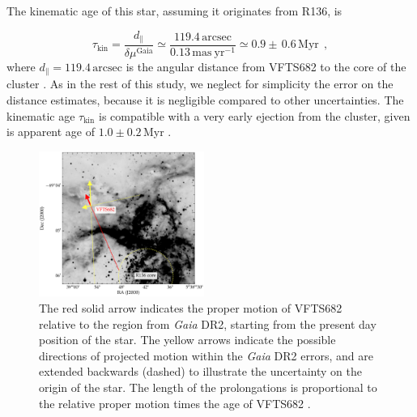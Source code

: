 \documentclass[apjl,twocolumn]{emulateapj}
\newcommand{\todo}[1]{{\large $\blacksquare$~\textbf{\color{red}[#1]}}~$\blacksquare$}
\begin{document}

The kinematic age of this star, assuming it originates from R136, is

\begin{equation}
  \label{eq:kin_age}
  \tau_\mathrm{kin} = \frac{d_\parallel}{\delta\mu^\mathrm{Gaia}} \simeq
  \frac{119.4\,\mathrm{arcsec}}{0.13\,\mathrm{mas\ yr^{-1}}} \simeq 0.9\pm\,0.6\, \mathrm{Myr} \ \ ,
\end{equation}
where $d_\parallel = 119.4\,\mathrm{arcsec}$ is the angular distance from VFTS682 to
the core of the cluster \citep[corresponding to $\sim$29\,pc at LMC distance,][]{bestenlehner:11}.
As in the rest of this study, we neglect for
simplicity the error on the distance estimates, because it is negligible compared to other uncertainties.
The kinematic age $\tau_\mathrm{kin}$ is compatible with a very early
ejection from the cluster, given is apparent age
of $1.0\pm 0.2$\,Myr \citep{schneider:18}. %




\begin{figure}%
  \centering
  \includegraphics[width=0.48\textwidth]{./figures/main_plot_good_gaia_only}  
  \caption{The red solid arrow indicates the proper motion of VFTS682
    relative to the region from \emph{Gaia} DR2, starting from the present day position of
    the star. The yellow arrows indicate the possible
    directions of projected motion within the \emph{Gaia} DR2 errors, and are extended
    backwards (dashed) to illustrate the uncertainty on the origin of the
    star. The length of the prolongations is proportional to the relative proper motion
    times the age of VFTS682 \citep[$1.0\pm0.2$\,Myr,][]{schneider:18}.
  }
  
  \label{fig:main}
\end{figure}
\end{document}
